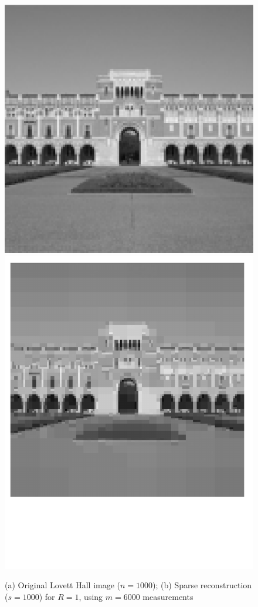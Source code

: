 \begin{figure}[h]
	\begin{center}
		\includegraphics[width=0.425\linewidth]{./fig/original_lovett.png}
		\includegraphics[width=0.45\linewidth,trim={0 4.2cm 0 0},clip]{./fig/reconst_lovett.pdf}
	\end{center}
	\caption{{(a) Original Lovett Hall image ($n=1000$); (b) Sparse reconstruction ($s=1000$) for $R=1$, using $m=6000$ measurements}}
	\label{fig:lovett}
\end{figure}

